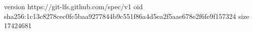version https://git-lfs.github.com/spec/v1
oid sha256:1c13c8278cec0fc5baa9277844b9c551f86a4d5ea2f5aae678e2f6fe9f157324
size 17424681
